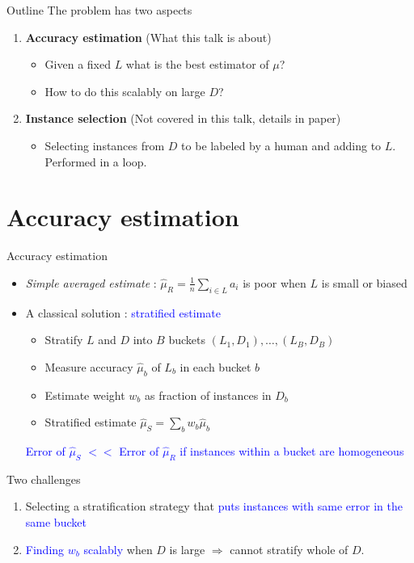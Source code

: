 \documentclass[usenames,dvipsnames, 11pt]{beamer}
\newcommand{\acc}{{a}}
\newcommand{\estSS}{{\mbox{$\hat{\mu}_S$}}}
\newlength{\wideitemsep}
\let\olditem\item
\renewcommand{\item}{\setlength{\itemsep}{\wideitemsep}\olditem}
\begin{document}
\begin{frame}{Outline}
The problem has two aspects \vspace{2mm}
\begin{enumerate}
\item \textbf{Accuracy estimation} (What this talk is about) \vspace{1mm}
\begin{itemize}
\item Given a fixed $L$ what is the best estimator of $\mu$? 
\item How to do this scalably on large $D$?
\end{itemize}
\vspace{3mm}
\item \textbf{Instance selection} (Not covered in this talk, details in paper)
\vspace{1mm}
\begin{itemize}
\item Selecting instances from $D$ to be labeled by a human and adding to $L$. Performed in a loop.
\end{itemize}
\end{enumerate}
\end{frame}

\section{Accuracy estimation}
\begin{frame}{Accuracy estimation}
\begin{itemize}
\pause
\item \emph{Simple averaged estimate} : $\hat{\mu}_R=\frac{1}{n}\sum_{i \in L}\acc_i$ is poor when $L$ is small or biased
\pause
\item A classical solution : \textcolor{Blue}{stratified estimate}
  \begin{itemize}
  \item Stratify $L$ and $D$ into $B$ buckets $(L_1,D_1),\ldots,(L_B,D_B)$ 
  \item Measure accuracy $\hat{\mu}_b$ of $L_b$ in each bucket $b$
  \item Estimate weight $w_b$ as fraction of instances in $D_b$
  \item Stratified estimate $\estSS=\sum_b{w_b\hat{\mu}_b}$
  \end{itemize}
  \pause
   \textcolor{Blue}{Error of $\estSS $ $<<$  Error of $\hat{\mu}_R$ if instances within a bucket are homogeneous}
\end{itemize}
\pause
Two challenges
\begin{enumerate}
\item Selecting a stratification strategy that \textcolor{Blue}{puts instances with same error in the same bucket}
\item \textcolor{Blue}{Finding $w_b$ scalably} when $D$ is large $\Rightarrow$ cannot stratify whole of $D$.
\end{enumerate}
\end{frame}
\end{document}
